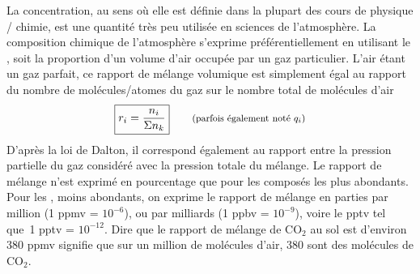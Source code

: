 \sk
La concentration, au sens où elle est définie dans la plupart des cours de physique / chimie, est une quantité très peu utilisée en sciences de l'atmosphère. La composition chimique de l'atmosphère s'exprime préférentiellement en utilisant le , soit la proportion d'un volume d'air occupée par un gaz particulier. L'air étant un gaz parfait, ce rapport de mélange volumique est simplement égal au rapport du nombre de molécules/atomes du gaz sur le nombre total de molécules d'air $$ \boxed{ r_i=\frac{n_i}{\Sigma n_k} } \qquad \textrm{\footnotesize (parfois également noté $q_i$)} $$ D'après la loi de Dalton, il correspond également au rapport entre la pression partielle du gaz considéré avec la pression totale du mélange. Le rapport de mélange n'est exprimé en pourcentage que pour les composés les plus abondants. Pour les , moins abondants, on exprime le rapport de mélange en parties par million (1 ppmv = $10^{-6}$), ou par milliards (1 ppbv = $10^{-9}$), voire le pptv tel que~1 pptv = $10^{-12}$. Dire que le rapport de mélange de CO$_2$ au sol est d’environ 380 ppmv signifie que sur un million de molécules d’air, 380 sont des molécules de CO$_2$. %

